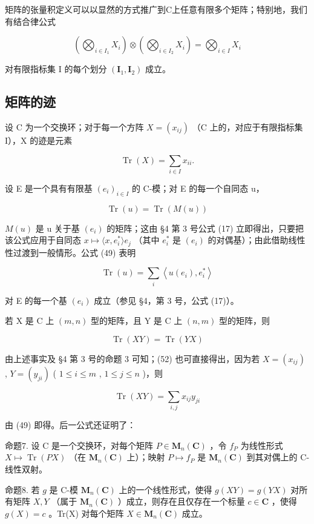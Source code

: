 矩阵的张量积定义可以以显然的方式推广到C上任意有限多个矩阵；特别地，我们有结合律公式

\[
\left(\bigotimes_ {i \in I _ {1}} X _ {i}\right) \otimes \left(\bigotimes_ {i \in I _ {2}} X _ {i}\right) = \bigotimes_ {i \in I} X _ {i}\tag{48}
\]

对有限指标集 I 的每个划分 \((\mathbf{I}_{1}, \mathbf{I}_{2})\) 成立。

\subsection{矩阵的迹}

设 C 为一个交换环；对于每一个方阵 \(X = (x_{ij})\) （C 上的，对应于有限指标集 I），X 的迹是元素

\[
\operatorname{Tr} (X) = \sum_ {i \in I} x _ {i i}.\tag{49}
\]

设 E 是一个具有有限基 \((e_{i})_{i\in I}\) 的 C-模；对 E 的每一个自同态 u，

\[
\operatorname{Tr} (u) = \operatorname{Tr} (M (u))\tag{50}
\]

\(M(u)\) 是 u 关于基 \((e_{i})\) 的矩阵；这由 §4 第 3 号公式 (17) 立即得出，只要把该公式应用于自同态 \(x \mapsto \langle x, e_{i}^{*} \rangle e_{j}\) （其中 \(e_{i}^{*}\) 是 \((e_{i})\) 的对偶基）；由此借助线性性过渡到一般情形。公式 (49) 表明

\[
\operatorname{Tr} (u) = \sum_ {i} \left\langle u (e _ {i}), e _ {i} ^ {*} \right\rangle\tag{51}
\]

对 E 的每一个基 \((e_i)\) 成立（参见 §4，第 3 号，公式 (17)）。

若 X 是 C 上 \((m, n)\) 型的矩阵，且 Y 是 C 上 \((n, m)\) 型的矩阵，则

\[
\operatorname{Tr} (X Y) = \operatorname{Tr} (Y X)\tag{52}
\]

由上述事实及 §4 第 3 号的命题 3 可知；(52) 也可直接得出，因为若 \(X = (x_{ij})\) , \(Y = (y_{ji})\) ( \(1 \leqslant i \leqslant m\) , \(1 \leqslant j \leqslant n\) )，则

\[
\operatorname{Tr} (X Y) = \sum_ {i, j} x _ {i j} y _ {j i}\tag{53}
\]

由 (49) 即得。后一公式还证明了：

命题7. 设 C 是一个交换环，对每个矩阵 \(P \in \mathbf{M}_n(\mathbf{C})\) ，令 \(f_P\) 为线性形式 \(X \mapsto \operatorname{Tr}(PX)\) （在 \(\mathbf{M}_n(\mathbf{C})\) 上）；映射 \(P \mapsto f_P\) 是 \(\mathbf{M}_n(\mathbf{C})\) 到其对偶上的 C-线性双射。

命题8. 若 \(g\) 是 C-模 \(\mathbf{M}_n(\mathbf{C})\) 上的一个线性形式，使得 \(g(XY) = g(YX)\) 对所有矩阵 \(X, Y\) （属于 \(\mathbf{M}_n(\mathbf{C})\) ）成立，则存在且仅存在一个标量 \(c \in \mathbf{C}\) ，使得 \(g(X) = c\) 。Tr(X) 对每个矩阵 \(X \in \mathbf{M}_n(\mathbf{C})\) 成立。

